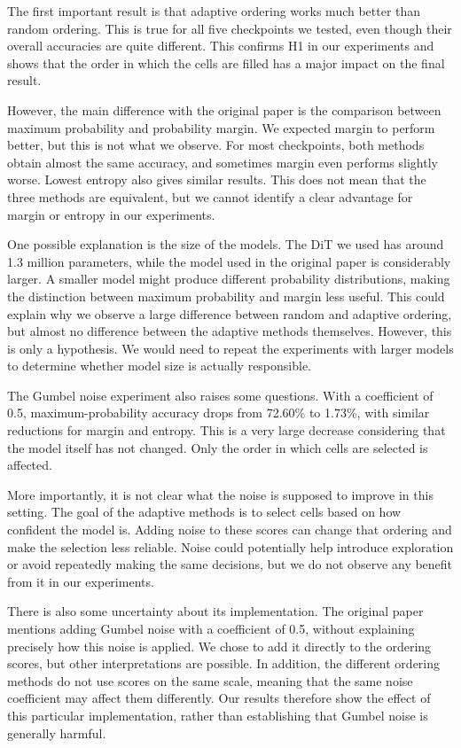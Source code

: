 \documentclass{article}
\begin{document}
The first important result is that adaptive ordering works much
better than random ordering. This is true for all five checkpoints
we tested, even though their overall accuracies are quite
different. This confirms H1 in our experiments and shows that
the order in which the cells are filled has a major impact on
the final result.

However, the main difference with the original paper is the
comparison between maximum probability and probability margin.
We expected margin to perform better, but this is not what we
observe. For most checkpoints, both methods obtain almost the
same accuracy, and sometimes margin even performs slightly worse.
Lowest entropy also gives similar results. This does not mean
that the three methods are equivalent, but we cannot identify
a clear advantage for margin or entropy in our experiments.

One possible explanation is the size of the models. The DiT
we used has around 1.3 million parameters, while the model
used in the original paper is considerably larger. A smaller
model might produce different probability distributions,
making the distinction between maximum probability and margin
less useful. This could explain why we observe a large
difference between random and adaptive ordering, but almost
no difference between the adaptive methods themselves.
However, this is only a hypothesis. We would need to repeat
the experiments with larger models to determine whether
model size is actually responsible.

The Gumbel noise experiment also raises some questions.
With a coefficient of 0.5, maximum-probability accuracy drops
from 72.60\% to 1.73\%, with similar reductions for margin
and entropy. This is a very large decrease considering that
the model itself has not changed. Only the order in which
cells are selected is affected.

More importantly, it is not clear what the noise is supposed
to improve in this setting. The goal of the adaptive methods
is to select cells based on how confident the model is.
Adding noise to these scores can change that ordering and
make the selection less reliable. Noise could potentially
help introduce exploration or avoid repeatedly making
the same decisions, but we do not observe any benefit from
it in our experiments.

There is also some uncertainty about its implementation.
The original paper mentions adding Gumbel noise with a
coefficient of 0.5, without explaining precisely how this
noise is applied. We chose to add it directly to the ordering
scores, but other interpretations are possible. In addition,
the different ordering methods do not use scores on the same
scale, meaning that the same noise coefficient may affect
them differently. Our results therefore show the effect
of this particular implementation, rather than establishing
that Gumbel noise is generally harmful.
\end{document}
